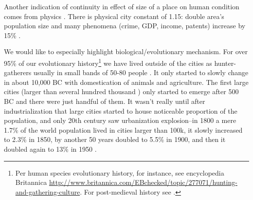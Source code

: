 \documentclass[10pt, letterpaper]{article}
\begin{document}
Another indication of continuity in effect of size of a place on human condition
comes from physics%
. There is physical city
constant of 1.15: double area's population size and many phenomena (crime, GDP, income, patents)  increase by 15\% \citep{blissCL_nov4_14,bettencourt10,bettencourt10b,bettencourt07}.

We would like to especially highlight biological/evolutionary mechanism.
%
For over 95\% of our evolutionary history\footnote{%
Per human species evolutionary history, for  instance, see encyclopedia Britannica
   \url{http://www.britannica.com/EBchecked/topic/277071/hunting-and-gathering-culture}. 
   For post-medieval history see \citet{white77}.%
 } we have lived outside of the cities as
hunter-gatherers usually in small bands of 50-80 people \citep{maryanski92}.
 It only started to slowly change in about 10,000 BC  with domestication of animals
 and agriculture. The first large cities (larger than several hundred thousand%
 ) only started to emerge
 after 500 BC and there were just handful of them. 
 It wasn't really
 until after industrialization that large cities started to house noticeable 
 proportion of the  population, and only 20th century saw urbanization explosion--in
 1800 a mere 1.7\% of the world population lived in cities larger than 100k, it
 slowly increased to 2.3\% in 1850, by another 50 years doubled to 5.5\% in 1900,
 and then it doubled again to 13\% in 1950 \citep{davis55}.
\end{document}
